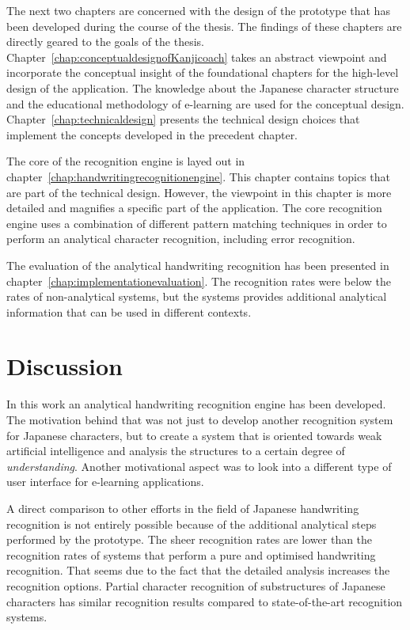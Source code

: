 The next two chapters are concerned with the design of the prototype
that has been developed during the course of the thesis. The findings 
of these chapters are directly geared to the goals of the thesis.
Chapter~\ref{chap:conceptualdesignofKanjicoach} takes an abstract viewpoint 
and incorporate the conceptual insight of the foundational chapters for the 
high-level design of the application. The knowledge about the 
Japanese character structure and the educational methodology of e-learning
are used for the conceptual design.
Chapter~\ref{chap:technicaldesign} presents the 
technical design choices that implement the concepts developed in the
precedent chapter. 

The core of the recognition engine is layed out in 
chapter~\ref{chap:handwritingrecognitionengine}. This chapter contains topics
that are part of the technical design. However, the viewpoint in this chapter
is more detailed and magnifies a specific part of the application. The core
recognition engine uses a combination of different pattern matching techniques
in order to perform an analytical character recognition, including error
recognition.

The evaluation of the analytical handwriting recognition has been
presented in chapter~\ref{chap:implementationevaluation}. The recognition rates
were below the rates of non-analytical systems, but the systems provides 
additional analytical information that can be used in different contexts.

\section{Discussion}
\label{sec:conclusion:discussion}

In this work an analytical handwriting recognition engine has been developed.
The motivation behind that was not just to develop another recognition system
for Japanese characters, but to create a system that is oriented towards
weak artificial intelligence and analysis the structures to a certain degree
of \emph{understanding}. Another motivational aspect was to look into a
different type of user interface for e-learning applications.

A direct comparison to other efforts in the field of Japanese handwriting 
recognition is not entirely possible because of the additional analytical steps
performed by the prototype.
The sheer recognition rates are lower than the recognition rates of systems
that perform a pure and optimised handwriting recognition.
That seems due to the fact that the detailed analysis increases the 
recognition options.
Partial character recognition of substructures of Japanese characters
has similar recognition results compared to state-of-the-art recognition 
systems.

